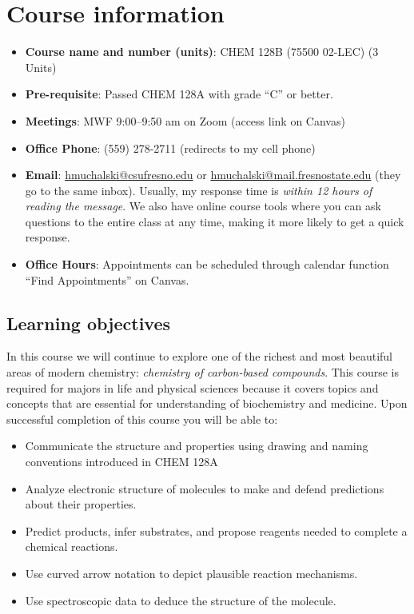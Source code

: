 \hypertarget{course-information}{%
\section{Course information}\label{course-information}}

\begin{itemize}
\tightlist
\item
  \textbf{Course name and number (units)}: CHEM 128B (75500 02-LEC) (3
  Units)
\item
  \textbf{Pre-requisite}: Passed CHEM 128A with grade ``C'' or better.
\item
  \textbf{Meetings}: MWF 9:00--9:50 am on Zoom (access link on Canvas)
\item
  \textbf{Office Phone}: (559) 278-2711 (redirects to my cell phone)
\item
  \textbf{Email}: \url{hmuchalski@csufresno.edu} or
  \url{hmuchalski@mail.fresnostate.edu} (they go to the same inbox).
  Usually, my response time is \emph{within 12 hours of reading the
  message}. We also have online course tools where you can ask questions
  to the entire class at any time, making it more likely to get a quick
  response.
\item
  \textbf{Office Hours}: Appointments can be scheduled through calendar
  function ``Find Appointments'' on Canvas.
\end{itemize}

\hypertarget{learning-objectives}{%
\subsection{Learning objectives}\label{learning-objectives}}

In this course we will continue to explore one of the richest and most
beautiful areas of modern chemistry: \emph{chemistry of carbon-based
compounds}. This course is required for majors in life and physical
sciences because it covers topics and concepts that are essential for
understanding of biochemistry and medicine. Upon successful completion
of this course you will be able to:

\begin{itemize}
\tightlist
\item
  Communicate the structure and properties using drawing and naming
  conventions introduced in CHEM 128A
\item
  Analyze electronic structure of molecules to make and defend
  predictions about their properties.
\item
  Predict products, infer substrates, and propose reagents needed to
  complete a chemical reactions.
\item
  Use curved arrow notation to depict plausible reaction mechanisms.
\item
  Use spectroscopic data to deduce the structure of the molecule.
\end{itemize}

